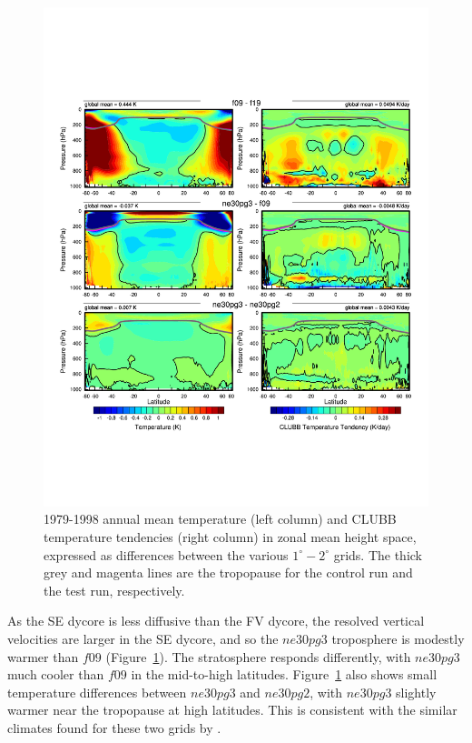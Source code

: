 \documentclass[draft]{agujournal2019}
\begin{document}
\begin{figure}[t]
\begin{center}
         \includegraphics[width=130mm]{figs/temp_dhgt_panel_STEND_CLUBB-lores.pdf}
\end{center}
\caption{1979-1998 annual mean temperature (left column) and CLUBB temperature tendencies (right column) in zonal mean height space, expressed as differences between the various $1^{\circ}-2^{\circ}$ grids. The thick grey and magenta lines are the tropopause for the control run and the test run, respectively.}
\label{fig:dT-lores}
\end{figure}

As the SE dycore is less diffusive than the FV dycore, the resolved vertical velocities are larger in the SE dycore, and so the $ne30pg3$ troposphere is modestly warmer than $f09$ (Figure~\ref{fig:dT-lores}). The stratosphere responds differently, with $ne30pg3$ much cooler than $f09$ in the mid-to-high latitudes. Figure~\ref{fig:dT-lores} also shows small temperature differences between $ne30pg3$ and $ne30pg2$, with  $ne30pg3$ slightly warmer near the tropopause at high latitudes. This is consistent with the similar climates found for these two grids by .
\end{document}
